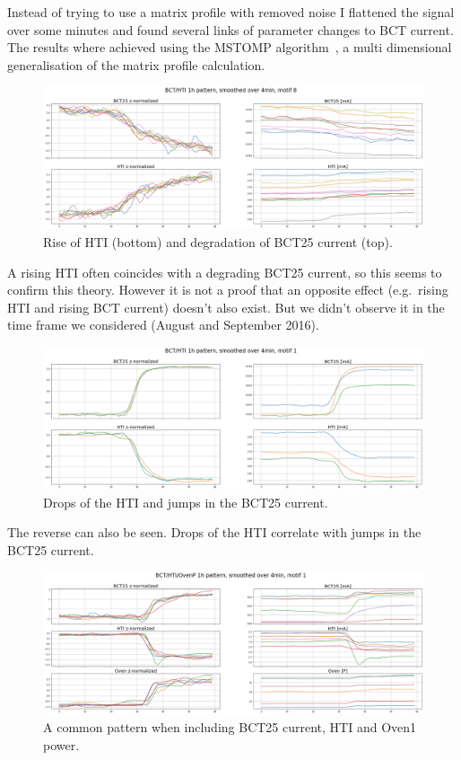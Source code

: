 \documentclass[12pt,a4paper]{article}
\begin{document}
Instead of trying to use a matrix profile with removed noise I flattened the signal over some minutes and found several links of parameter changes to BCT current. The results where achieved using the MSTOMP algorithm~\cite{Yeh:MatrixProfileVI}, a multi dimensional
generalisation of the matrix profile calculation.

\begin{figure}
\centering
\includegraphics{images/hti_bct_htirise.png}
\caption{Rise of HTI (bottom) and degradation of BCT25 current (top).}
\end{figure}

A rising HTI often coincides with a degrading BCT25 current, so this seems to confirm this theory. However it is not a proof that an opposite effect (e.g.~rising HTI and rising BCT current) doesn't also exist. But we didn't observe it in the time frame we considered (August and September 2016).

\begin{figure}
\centering
\includegraphics{images/hti_bct_htifall.png}
\caption{Drops of the HTI and jumps in the BCT25 current.}
\end{figure}

The reverse can also be seen. Drops of the HTI correlate with jumps in the BCT25 current.

\begin{figure}
\centering
\includegraphics{images/bct_oven_hti.png}
\caption{A common pattern when including BCT25 current, HTI and Oven1 power.}
\end{figure}
\end{document}
